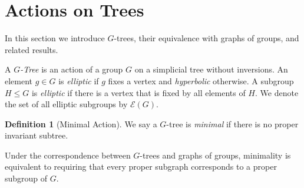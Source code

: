 \documentclass[12pt,parskip=full]{report}
\theoremstyle{plain}
\theoremstyle{definition}
\newtheorem{dfn}[thm]{Definition}
\newtheorem{exa}[thm]{Example}
\begin{document}

















\section{Actions on Trees}

In this section we introduce \(G\)-trees, their equivalence with graphs of groups, and related results.

A \emph{\(G\)-Tree} is an action of a group \(G\) on a simplicial tree without inversions. An element \(g\in G\) is \emph{elliptic} if \(g\) fixes a vertex and \emph{hyperbolic} otherwise. A subgroup \(H\leq G\) is \emph{elliptic} if there is a vertex that is fixed by all elements of \(H\). We denote the set of all elliptic subgroups by \(\mathcal{E}(G)\).

\begin{dfn}
    [Minimal Action]
    \label{defn:minimal}
    We say a $G$-tree is \emph{minimal} if there is no proper invariant subtree.
\end{dfn}

Under the correspondence between \(G\)-trees and graphs of groups, minimality is equivalent to requiring that every proper subgraph corresponds to a proper subgroup of \(G\).
\end{document}
